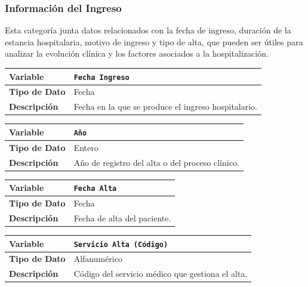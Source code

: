 \documentclass[12pt,a4paper,onecolumn,oneside]{report}
\begin{document}
\subsubsection{Información del Ingreso}
Esta categoría junta datos relacionados con la fecha de ingreso, duración de la estancia hospitalaria, motivo de ingreso y tipo de alta, que pueden ser útiles para analizar la evolución clínica y los factores asociados a la hospitalización.

\vspace{0.3cm}
\noindent
\begin{tabular}{|p{3.5cm}|p{10.5cm}|}
\hline
\rowcolor[RGB]{239,239,239} 
\textbf{Variable} & \textbf{\texttt{Fecha Ingreso}} \\ \hline
\textbf{Tipo de Dato} & Fecha \\ \hline
\textbf{Descripción} & Fecha en la que se produce el ingreso hospitalario. \\ \hline
\end{tabular}
\label{tab:var_ingreso}
\vspace{0.4cm}

\noindent
\begin{tabular}{|p{3.5cm}|p{10.5cm}|}
\hline
\rowcolor[RGB]{239,239,239} 
\textbf{Variable} & \textbf{\texttt{Año}} \\ \hline
\textbf{Tipo de Dato} & Entero \\ \hline
\textbf{Descripción} & Año de registro del alta o del proceso clínico. \\ \hline
\end{tabular}
\label{tab:var_ano}
\vspace{0.4cm}

\noindent
\begin{tabular}{|p{3.5cm}|p{10.5cm}|}
\hline
\rowcolor[RGB]{239,239,239} 
\textbf{Variable} & \textbf{\texttt{Fecha Alta}} \\ \hline
\textbf{Tipo de Dato} & Fecha \\ \hline
\textbf{Descripción} & Fecha de alta del paciente. \\ \hline
\end{tabular}
\label{tab:var_fecha_alta}
\vspace{0.4cm}

\noindent
\begin{tabular}{|p{3.5cm}|p{10.5cm}|}
\hline
\rowcolor[RGB]{239,239,239} 
\textbf{Variable} & \textbf{\texttt{Servicio Alta (Código)}} \\ \hline
\textbf{Tipo de Dato} & Alfanumérico \\ \hline
\textbf{Descripción} & Código del servicio médico que gestiona el alta. \\ \hline
\end{tabular}
\label{tab:var_servicio_alta}
\vspace{0.4cm}
\end{document}
